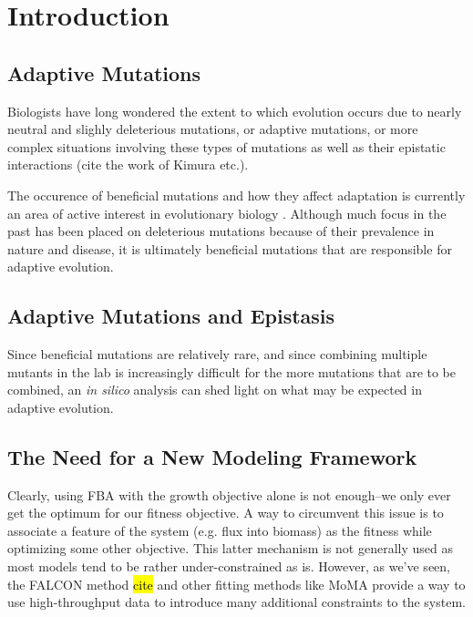 \section{Introduction}

\subsection{Adaptive Mutations}

Biologists have long wondered the extent to which evolution occurs due
to nearly neutral and slighly deleterious mutations, or adaptive
mutations, or more complex situations involving these types of
mutations as well as their epistatic interactions (cite the work of
Kimura etc.).

The occurence of beneficial mutations and how they affect adaptation
is currently an area of active interest in evolutionary biology
\citep{Chou2011, Weinreich2006}. Although much focus in the past
has been placed on deleterious mutations because of their prevalence
in nature and disease, it is ultimately beneficial mutations that
are responsible for adaptive evolution.
 
\subsection{Adaptive Mutations and Epistasis}



Since beneficial mutations are relatively rare, and since
combining multiple mutants in the lab is increasingly difficult for
the more mutations that are to be combined, an \textit{in silico}
analysis can shed light on what may be expected in adaptive
evolution.



\subsection{The Need for a New Modeling Framework}
Clearly, using FBA with the growth objective alone is not enough--we
only ever get the optimum for our fitness objective.  A way to
circumvent this issue is to associate a feature of the system
(e.g. flux into biomass) as the fitness while optimizing some other
objective. This latter mechanism is not generally used as most models
tend to be rather under-constrained as is. However, as we've seen, the
FALCON method \hl{cite} and other fitting methods like MoMA provide a
way to use high-throughput data to introduce many additional
constraints to the system.

